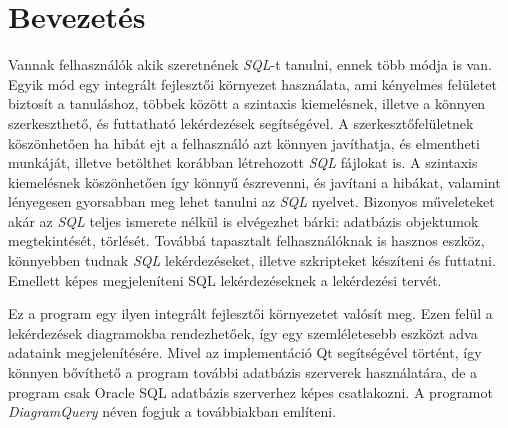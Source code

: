 \chapter{Bevezetés}

Vannak felhasználók akik szeretnének \textit{SQL}-t tanulni, ennek több módja is van.
Egyik mód egy integrált fejlesztői környezet használata, ami kényelmes
felületet biztosít a tanuláshoz, többek között a szintaxis kiemelésnek,
illetve a könnyen szerkeszthető, és futtatható lekérdezések segítségével.
A szerkesztőfelületnek köszönhetően ha hibát ejt a felhasználó azt könnyen
javíthatja, és elmentheti munkáját, illetve betölthet korábban létrehozott
\textit{SQL} fájlokat is. A szintaxis kiemelésnek köszönhetően így könnyű észrevenni,
és javítani a hibákat, valamint lényegesen gyorsabban meg lehet tanulni az \textit{SQL}
nyelvet. Bizonyos műveleteket akár az \textit{SQL} teljes ismerete nélkül is elvégezhet bárki:
adatbázis objektumok megtekintését, törlését.
Továbbá tapasztalt felhasználóknak is hasznos eszköz, könnyebben tudnak \textit{SQL}
lekérdezéseket, illetve szkripteket készíteni és futtatni. Emellett képes megjeleníteni
SQL lekérdezéseknek a lekérdezési tervét.

Ez a program egy ilyen integrált fejlesztői környezetet valósít meg. Ezen felül a lekérdezések
diagramokba rendezhetőek, így egy szemléletesebb eszközt adva adataink megjelenítésére. Mivel az
implementáció Qt segítségével történt, így könnyen bővíthető a program további adatbázis szerverek
használatára, de a program csak Oracle SQL adatbázis szerverhez képes csatlakozni.
A programot \textit{DiagramQuery} néven fogjuk a továbbiakban említeni.
